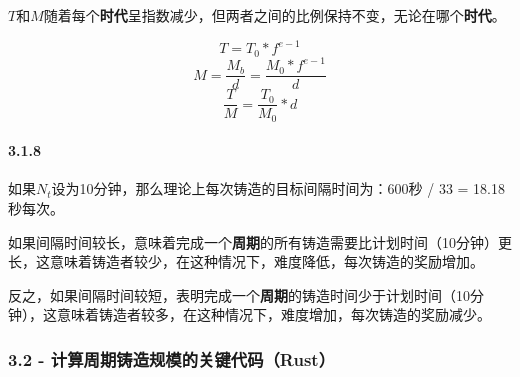 \documentclass[
]{article}
\begin{document}
\(T\)和\(M\)随着每个\textbf{时代}呈指数减少，但两者之间的比例保持不变，无论在哪个\textbf{时代}。

\begin{equation}
T=T_0*f^{e-1}
\end{equation} \begin{equation}
M = \frac{M_b}{d}=\frac{M_0 * f^{e-1}}{d}
\end{equation} \begin{equation}
\frac{T}{M} = \frac{T_0}{M_0} * d
\end{equation}

\paragraph{3.1.8}\label{section-2}

如果\(N_t\)设为10分钟，那么理论上每次铸造的目标间隔时间为：600秒 / 33 =
18.18秒每次。

如果间隔时间较长，意味着完成一个\textbf{周期}的所有铸造需要比计划时间（10分钟）更长，这意味着铸造者较少，在这种情况下，难度降低，每次铸造的奖励增加。

反之，如果间隔时间较短，表明完成一个\textbf{周期}的铸造时间少于计划时间（10分钟），这意味着铸造者较多，在这种情况下，难度增加，每次铸造的奖励减少。

\subsubsection{3.2 -
计算周期铸造规模的关键代码（Rust）}\label{ux8ba1ux7b97ux5468ux671fux94f8ux9020ux89c4ux6a21ux7684ux5173ux952eux4ee3ux7801rust}
\end{document}
